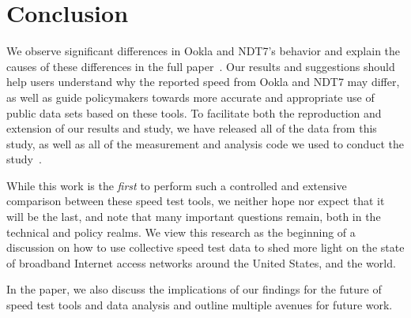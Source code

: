 \section{Conclusion}\label{sec:conclusion}

We observe significant 
differences in 
Ookla and NDT7’s behavior and explain the causes of these differences in the
full paper~\cite{macmillan2023}. Our results and 
suggestions should help users understand why the reported speed from Ookla and NDT7 may 
differ, as well as guide policymakers towards 
more accurate and appropriate  use of public data sets based on these tools.  To facilitate 
both the  reproduction and extension of  our
results and study, we have released all of the data from this study, as well
as all of the measurement and analysis code we used to conduct the 
study~\cite{netrics-code,netrics-data}. 

While this work is the {\em first} to perform such a controlled and extensive
comparison between these speed test tools, we neither hope nor expect that it
will be the last, and note that many important questions remain, both in the
technical and policy realms. We view this research as the beginning of a
discussion on how to use collective speed test data to shed more light on the
state of broadband Internet access networks around the United States, and the
world.

In the paper, we also discuss the implications of our findings for the future of
speed test tools and data analysis and outline multiple avenues for future work. 


